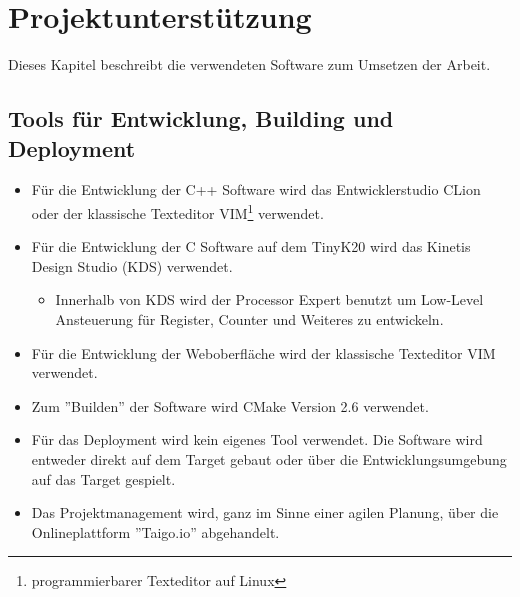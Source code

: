 \section{Projektunterstützung}
Dieses Kapitel beschreibt die verwendeten Software zum Umsetzen der Arbeit.

\subsection{Tools für Entwicklung, Building und Deployment}
\begin{itemize}
    \item Für die Entwicklung der C++ Software wird das Entwicklerstudio CLion oder der klassische Texteditor VIM\footnote{programmierbarer Texteditor auf Linux} verwendet.
    \item Für die Entwicklung der C Software auf dem TinyK20 wird das Kinetis Design Studio (KDS) verwendet.
    \begin{itemize}
        \item Innerhalb von KDS wird der Processor Expert benutzt um Low-Level Ansteuerung für Register, Counter und Weiteres zu entwickeln.
    \end{itemize}
    \item Für die Entwicklung der Weboberfläche wird der klassische Texteditor VIM verwendet.
    \item Zum ''Builden'' der Software wird CMake Version 2.6 verwendet.
    \item Für das Deployment wird kein eigenes Tool verwendet. Die Software wird entweder direkt auf dem Target gebaut oder über die Entwicklungsumgebung auf das Target gespielt.
    \item Das Projektmanagement wird, ganz im Sinne einer agilen Planung, über die Onlineplattform ''Taigo.io'' abgehandelt.
\end{itemize}